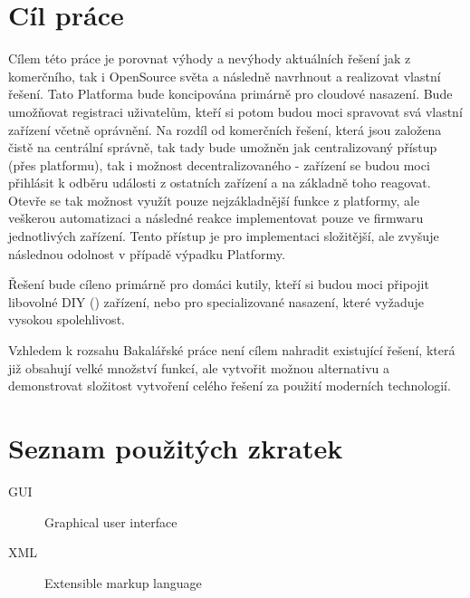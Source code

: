\documentclass[thesis=B,czech]{FITthesis}[2019/12/23]
\begin{document}
\chapter{Cíl práce}
Cílem této práce je porovnat výhody a nevýhody aktuálních řešení jak z komerčního, tak i OpenSource světa a následně navrhnout a realizovat vlastní řešení. Tato Platforma bude koncipována primárně pro cloudové nasazení. Bude umožňovat registraci uživatelům, kteří si potom budou moci spravovat svá vlastní zařízení včetně oprávnění. Na rozdíl od komerčních řešení, která jsou založena čistě na centrální správně, tak tady bude umožněn jak centralizovaný přístup (přes platformu), tak i možnost decentralizovaného - zařízení se budou moci přihlásit k odběru události z ostatních zařízení a na základně toho reagovat. Otevře se tak možnost využít pouze nejzákladnější funkce z platformy, ale veškerou automatizaci a následné reakce implementovat pouze ve firmwaru jednotlivých zařízení. Tento přístup je pro implementaci složitější, ale zvyšuje následnou odolnost v případě výpadku Platformy.

Řešení bude cíleno primárně pro domáci kutily, kteří si budou moci připojit libovolné DIY () zařízení, nebo pro specializované nasazení, které vyžaduje vysokou spolehlivost.

Vzhledem k rozsahu Bakalářské práce není cílem nahradit existující řešení, která již obsahují velké množství funkcí, ale vytvořit možnou alternativu a demonstrovat složitost vytvoření celého řešení za použití moderních technologií.











\begin{conclusion}
\end{conclusion}




\appendix

\chapter{Seznam použitých zkratek}
\begin{description}
    \item[GUI] Graphical user interface
    \item[XML] Extensible markup language
\end{description}
\end{document}
